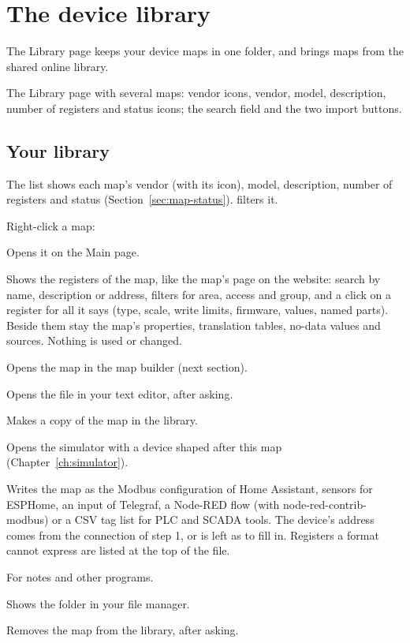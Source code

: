 \chapter{The device library}
\label{ch:library}

The Library page keeps your device maps in one folder, and brings maps from
the shared online library.

  {The Library page with several maps: vendor icons, vendor, model,
   description, number of registers and status icons; the search field and the
   two import buttons.}

\section{Your library}

The list shows each map's vendor (with its icon), model, description, number
of registers and status (Section~\ref{sec:map-status}).  filters it.

Right-click a map:

\begin{description}[style=nextline, leftmargin=0pt, font=\intermedium]
  \item[Use] Opens it on the Main page.
  \item[Explore] Shows the registers of the map, like the map's page on the
    website: search by name, description or address, filters for area, access
    and group, and a click on a register for all it says (type, scale, write
    limits, firmware, values, named parts). Beside them stay the map's
    properties, translation tables, no-data values and sources. Nothing is
    used or changed.
  \item[Edit…] Opens the map in the map builder (next section).
  \item[Open in a text editor…] Opens the file in your text editor, after
    asking.
  \item[Duplicate] Makes a copy of the map in the library.
  \item[Simulate this device] Opens the simulator with a device shaped after
    this map (Chapter~\ref{ch:simulator}).
  \item[Export for other software…] Writes the map as the Modbus
    configuration of Home Assistant, sensors for ESPHome, an input of
    Telegraf, a Node-RED flow (with node-red-contrib-modbus) or a CSV tag list
    for PLC and SCADA tools. The device's address comes from
    the connection of step 1, or is left as  to fill in. Registers
    a format cannot express are listed at the top of the file.
  \item[Copy name, Copy file path] For notes and other programs.
  \item[Open the library folder] Shows the folder in your file manager.
  \item[Delete…] Removes the map from the library, after asking.
\end{description}

